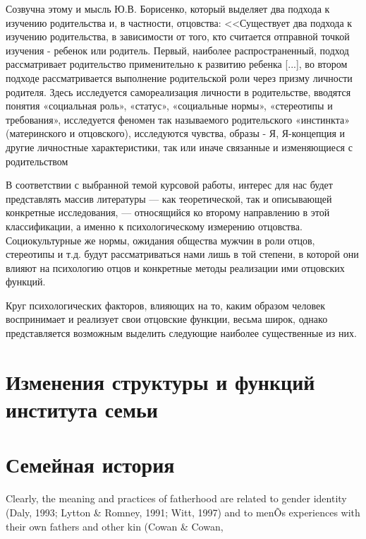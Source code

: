 \documentclass{../../common/thesisbyxetex}
\begin{document}
Созвучна этому и мысль Ю.В. Борисенко, который выделяет два подхода к изучению родительства и, в 
частности, отцовства: <<Существует два подхода к изучению родительства, в зависимости от того, кто 
считается отправной точкой изучения - ребенок или родитель. Первый, наиболее распространенный, 
подход рассматривает родительство применительно к развитию ребенка [...], во втором подходе 
рассматривается выполнение родительской роли через призму личности родителя. Здесь исследуется 
самореализация личности в родительстве, вводятся понятия «социальная роль», «статус», «социальные 
нормы», «стереотипы и требования», исследуется феномен так называемого родительского «инстинкта»
(материнского и отцовского), исследуются чувства, образы - Я, Я-концепция и другие личностные 
характеристики, так или иначе связанные и изменяющиеся с родительством \cite[11]{psyot}

В соответствии с выбранной темой курсовой работы, интерес для нас будет представлять массив 
литературы --- как теоретической, так и описывающей конкретные исследования, --- относящийся ко 
второму направлению в этой классификации, а именно к психологическому измерению отцовства. 
Социокультурные же нормы, ожидания общества мужчин в роли отцов, стереотипы и т.д. будут 
рассматриваться нами лишь в той степени, в которой они влияют на психологию отцов и конкретные 
методы реализации ими отцовских функций.



Круг психологических факторов, влияющих на то, каким 
образом человек воспринимает и реализует свои отцовские функции, весьма широк, однако 
представляется 
возможным выделить следующие наиболее существенные из них.



\section{Изменения структуры и функций института семьи}




\section{Семейная история}


Clearly, the meaning and practices of fatherhood
are related to gender identity (Daly, 1993; Lytton \&
Romney, 1991; Witt, 1997) and to menÕs experiences
with their own fathers and other kin (Cowan \& Cowan,
\cite[131]{f21}
\end{document}
